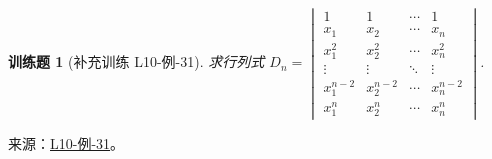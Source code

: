 \documentclass[12pt,fontset=fandol]{ctexart}
\newtheorem{exercise}{训练题}[section]
\begin{document}
\begin{exercise}[补充训练 L10-例-31]\label{prob:L10-例-31}
求行列式 $D_n=\begin{vmatrix}
            1         & 1         & \cdots & 1         \\
            x_1       & x_2       & \cdots & x_n       \\
            x_1^{2}   & x_2^{2}   & \cdots & x_n^{2}   \\
            \vdots    & \vdots    & \ddots & \vdots    \\
            x_1^{n-2} & x_2^{n-2} & \cdots & x_n^{n-2} \\
            x_1^{n}   & x_2^{n}   & \cdots & x_n^{n}
        \end{vmatrix}$.
\end{exercise}
\noindent 来源：\href{https://github.com/yhwu-is/Linear-Algebra-Left-Undone/blob/new/%E8%AE%B2%E4%B9%89/%E4%B8%93%E9%A2%98/10%20%E8%A1%8C%E5%88%97%E5%BC%8F.tex}{L10-例-31}。
\end{document}
